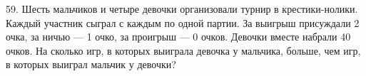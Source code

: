 59. Шесть мальчиков и четыре девочки организовали турнир в крестики-нолики. Каждый участник сыграл с каждым по одной партии. За выигрыш присуждали 2 очка, за ничью --- 1 очко, за проигрыш --- 0 очков. Девочки вместе набрали 40 очков. На сколько игр, в которых выиграла девочка у мальчика, больше, чем игр, в которых выиграл мальчик у девочки?\\
